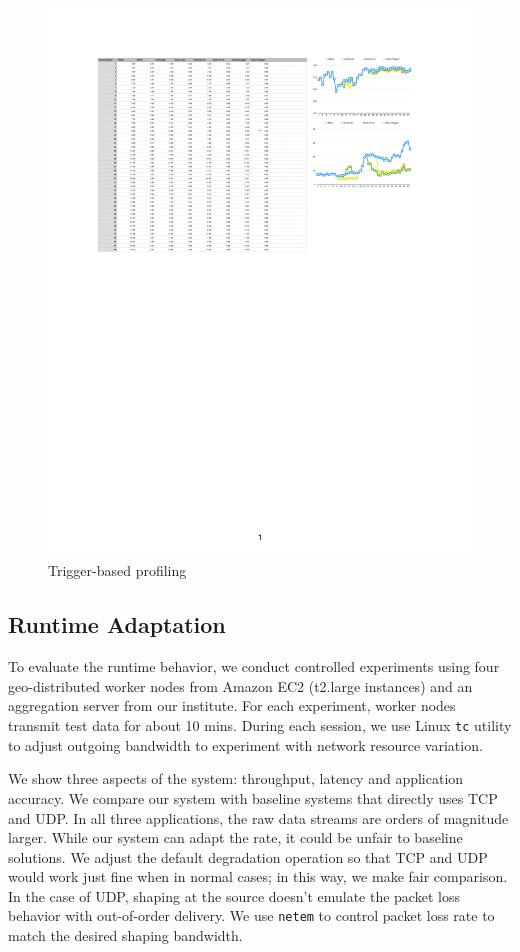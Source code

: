 \begin{figure}
  \centering
  \includegraphics[width=\columnwidth]{figures/online-tricks.pdf}
  \caption{Trigger-based profiling}
  \label{fig:online-tricks}
\end{figure}

\subsection{Runtime Adaptation}
\label{sec:runtime-adaptation}

To evaluate the runtime behavior, we conduct controlled experiments using four
geo-distributed worker nodes from Amazon EC2 (t2.large instances) and an
aggregation server from our institute. For each experiment, worker nodes
transmit test data for about 10 mins. During each session, we use Linux
\texttt{tc} utility to adjust outgoing bandwidth to experiment with network
resource variation.

We show three aspects of the system: throughput, latency and application
accuracy. We compare our system with baseline systems that directly uses TCP and
UDP. In all three applications, the raw data streams are orders of magnitude
larger. While our system can adapt the rate, it could be unfair to baseline
solutions. We adjust the default degradation operation so that TCP and UDP would
work just fine when in normal cases; in this way, we make fair comparison. In
the case of UDP, shaping at the source doesn't emulate the packet loss behavior
with out-of-order delivery. We use \texttt{netem} to control packet loss rate to
match the desired shaping bandwidth.


